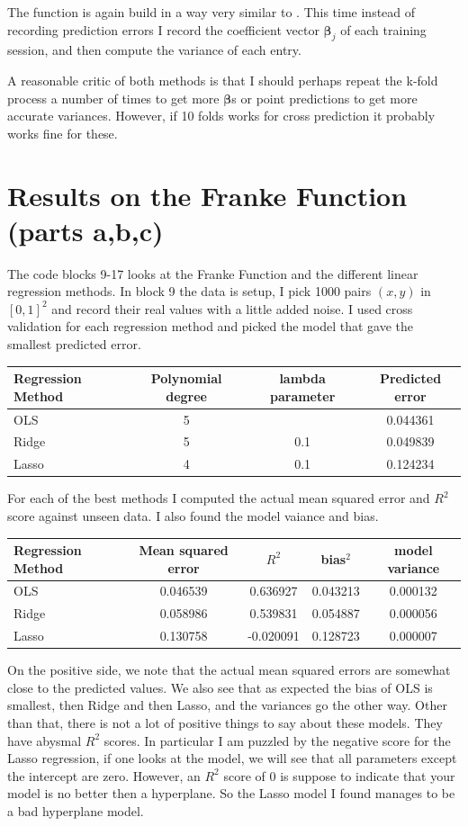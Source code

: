 \documentclass[parskip=half]{scrartcl}
\theoremstyle{definition}
\theoremstyle{remark}
\newcommand{\vect}[1]{{\bm{#1}}}
\newcommand{\funcname}[1]{{\color{blue}{\texttt{#1}}}}
\begin{document}
The function \funcname{beta\_variance} is again build in a way very similar to \funcname{cross\_validation}. 
This time instead of recording prediction errors I record the coefficient vector $\vect{\beta}_j$ of each training session, and then compute the variance of each entry. 

A reasonable critic of both methods is that I should perhaps repeat the k-fold process a number of times to get more $\vect{\beta}$s or point predictions to get more accurate variances.
However, if 10 folds works for cross prediction it probably works fine for these.

\section{Results on the Franke Function (parts a,b,c)} \label{sec:franke}

The code blocks 9-17 looks at the Franke Function and the different linear regression methods. 
In block 9 the data is setup, I pick 1000 pairs $(x,y)$ in $[0,1]^2$ and record their real values with a little added noise. 
I used cross validation for each regression method and picked the model that gave the smallest predicted error.

\begin{tabular}{l|ccc}
Regression Method & Polynomial degree & lambda parameter & Predicted error \\ 
\hline
\hline 
OLS & 5 &  & 0.044361 \\ 
Ridge & 5 & 0.1 & 0.049839 \\ 
Lasso & 4 & 0.1 & 0.124234
\end{tabular} 

For each of the best methods I computed the actual mean squared error and $R^2$ score against unseen data. 
I also found the model vaiance and bias.

\begin{tabular}{l|cccc}
Regression Method & Mean squared error & $R^2$ & bias$^2$ & model variance  \\ 
\hline
\hline 
OLS &  0.046539 & 0.636927 & 0.043213 & 0.000132 \\ 
Ridge & 0.058986 & 0.539831 & 0.054887 & 0.000056 \\ 
Lasso & 0.130758 & -0.020091 & 0.128723 & 0.000007
\end{tabular} 

On the positive side, we note that the actual mean squared errors are somewhat close to the predicted values.
We also see that as expected the bias of OLS is smallest, then Ridge and then Lasso, and the variances go the other way.    
Other than that, there is not a lot of positive things to say about these models. 
They have abysmal $R^2$ scores.
In particular I am puzzled by the negative score for the Lasso regression, if one looks at the model, we will see that all parameters except the intercept are zero. 
However, an $R^2$ score of $0$ is suppose to indicate that your model is no better then a hyperplane. 
So the Lasso model I found manages to be a bad hyperplane model.  
\end{document}
